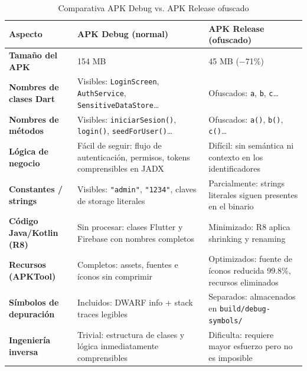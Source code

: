 \documentclass[12pt,a4paper]{article}
\begin{document}
\begin{table}[H]
\centering
\renewcommand{\arraystretch}{1.4}
\caption{Comparativa APK Debug vs. APK Release ofuscado}
\begin{tabularx}{\linewidth}{>{\bfseries}p{3.5cm} X X}
\toprule
\rowcolor{azulTitulo!12}
\textbf{Aspecto} & \textbf{APK Debug (normal)} & \textbf{APK Release (ofuscado)} \\
\midrule

Tamaño del APK
  & 154 MB
  & 45 MB \textcolor{verdeOk}{(−71\%)} \\

\rowcolor{grisClaro}
Nombres de clases Dart
  & \textcolor{rojoMal}{Visibles}: \texttt{LoginScreen}, \texttt{AuthService}, \texttt{SensitiveDataStore}…
  & \textcolor{verdeOk}{Ofuscados}: \texttt{a}, \texttt{b}, \texttt{c}… \\

Nombres de métodos
  & \textcolor{rojoMal}{Visibles}: \texttt{iniciarSesion()}, \texttt{login()}, \texttt{seedForUser()}…
  & \textcolor{verdeOk}{Ofuscados}: \texttt{a()}, \texttt{b()}, \texttt{c()}… \\

\rowcolor{grisClaro}
Lógica de negocio
  & \textcolor{rojoMal}{Fácil de seguir}: flujo de autenticación, permisos, tokens comprensibles en JADX
  & \textcolor{verdeOk}{Difícil}: sin semántica ni contexto en los identificadores \\

Constantes / strings
  & \textcolor{rojoMal}{Visibles}: \texttt{"admin"}, \texttt{"1234"}, claves de storage literales
  & \textcolor{naranja}{Parcialmente}: strings literales siguen presentes en el binario \\

\rowcolor{grisClaro}
Código Java/Kotlin (R8)
  & \textcolor{rojoMal}{Sin procesar}: clases Flutter y Firebase con nombres completos
  & \textcolor{verdeOk}{Minimizado}: R8 aplica shrinking y renaming \\

Recursos (APKTool)
  & \textcolor{rojoMal}{Completos}: assets, fuentes e íconos sin comprimir
  & \textcolor{verdeOk}{Optimizados}: fuente de íconos reducida 99.8\%, recursos eliminados \\

\rowcolor{grisClaro}
Símbolos de depuración
  & \textcolor{rojoMal}{Incluidos}: DWARF info + stack traces legibles
  & \textcolor{verdeOk}{Separados}: almacenados en \texttt{build/debug-symbols/} \\

Ingeniería inversa
  & \textcolor{rojoMal}{Trivial}: estructura de clases y lógica inmediatamente comprensibles
  & \textcolor{naranja}{Dificulta}: requiere mayor esfuerzo pero no es imposible \\

\bottomrule
\end{tabularx}
\end{table}
\end{document}
